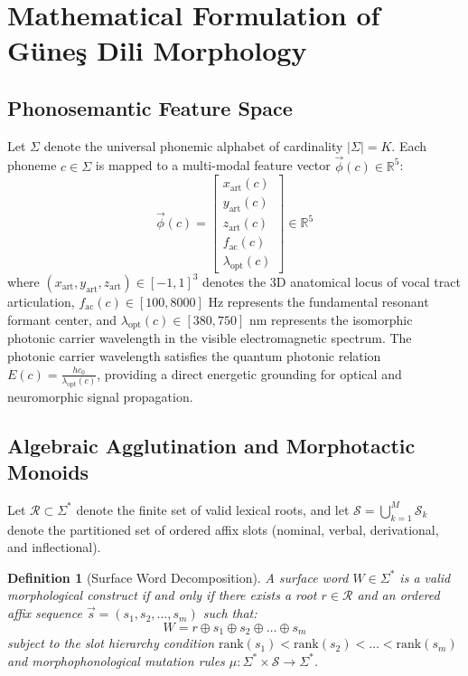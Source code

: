 \documentclass[11pt,letterpaper]{article}
\newtheorem{definition}[theorem]{Definition}
\begin{document}
\section{Mathematical Formulation of G\"{u}ne\c{s} Dili Morphology}

\subsection{Phonosemantic Feature Space}

Let $\Sigma$ denote the universal phonemic alphabet of cardinality $|\Sigma| = K$. Each phoneme $c \in \Sigma$ is mapped to a multi-modal feature vector $\vec{\phi}(c) \in \mathbb{R}^5$:
\begin{equation}
\vec{\phi}(c) = \begin{bmatrix}
x_{\text{art}}(c) \\
y_{\text{art}}(c) \\
z_{\text{art}}(c) \\
f_{\text{ac}}(c) \\
\lambda_{\text{opt}}(c)
\end{bmatrix} \in \mathbb{R}^5
\end{equation}
where $(x_{\text{art}}, y_{\text{art}}, z_{\text{art}}) \in [-1, 1]^3$ denotes the 3D anatomical locus of vocal tract articulation, $f_{\text{ac}}(c) \in [100, 8000]\text{ Hz}$ represents the fundamental resonant formant center, and $\lambda_{\text{opt}}(c) \in [380, 750]\text{ nm}$ represents the isomorphic photonic carrier wavelength in the visible electromagnetic spectrum. The photonic carrier wavelength satisfies the quantum photonic relation $E(c) = \frac{h c_0}{\lambda_{\text{opt}}(c)}$, providing a direct energetic grounding for optical and neuromorphic signal propagation.

\subsection{Algebraic Agglutination and Morphotactic Monoids}

Let $\mathcal{R} \subset \Sigma^*$ denote the finite set of valid lexical roots, and let $\mathcal{S} = \bigcup_{k=1}^M \mathcal{S}_k$ denote the partitioned set of ordered affix slots (nominal, verbal, derivational, and inflectional).

\begin{definition}[Surface Word Decomposition]
A surface word $W \in \Sigma^*$ is a valid morphological construct if and only if there exists a root $r \in \mathcal{R}$ and an ordered affix sequence $\vec{s} = (s_1, s_2, \dots, s_m)$ such that:
\begin{equation}
W = r \oplus s_1 \oplus s_2 \oplus \dots \oplus s_m
\end{equation}
subject to the slot hierarchy condition $\text{rank}(s_1) < \text{rank}(s_2) < \dots < \text{rank}(s_m)$ and morphophonological mutation rules $\mu: \Sigma^* \times \mathcal{S} \to \Sigma^*$.
\end{definition}
\end{document}
